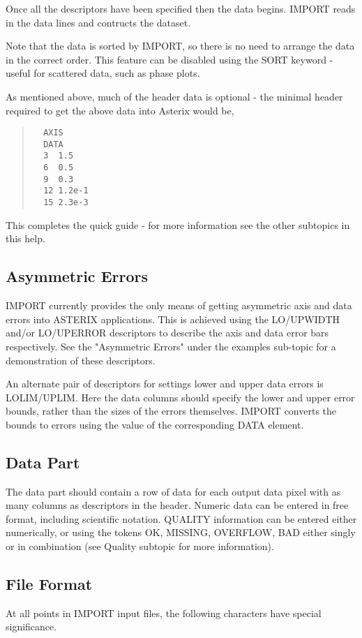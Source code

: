 \documentclass{book}
\renewcommand{\_}{{\tt\char'137}}     %
\begin{document}
Once all the descriptors have been specified then the data
begins. IMPORT reads in the data lines and contructs the dataset.

Note that the data is sorted by IMPORT, so there is no need to
arrange the data in the correct order. This feature can be
disabled using the SORT keyword - useful for scattered data,
such as phase plots.

As mentioned above, much of the header data is optional - the
minimal header required to get the above data into Asterix
would be,

\begin{quote}\begin{verbatim}
  AXIS
  DATA
  3  1.5
  6  0.5
  9  0.3
  12 1.2e-1
  15 2.3e-3
\end{verbatim}\end{quote}
This completes the quick guide - for more information see the
other subtopics in this help.

\subsection{Asymmetric Errors}
IMPORT currently provides the only means of getting asymmetric
axis and data errors into ASTERIX applications. This is achieved
using the LO/UPWIDTH and/or LO/UPERROR descriptors to describe
the axis and data error bars respectively. See the "Asymmetric
Errors" under the examples sub-topic for a demonstration of
these descriptors.

An alternate pair of descriptors for settings lower and upper
data errors is LOLIM/UPLIM. Here the data columns should specify
the lower and upper error bounds, rather than the sizes of the
errors themselves. IMPORT converts the bounds to errors using the
value of the corresponding DATA element.

\subsection{Data Part}
The data part should contain a row of data for each output data
pixel with as many columns as descriptors in the header. Numeric
data can be entered in free format, including scientific notation.
QUALITY information can be entered either numerically, or using
the tokens OK, MISSING, OVERFLOW, BAD either singly or in
combination (see Quality subtopic for more information).

\subsection{File Format}
At all points in IMPORT input files, the following characters
have special significance.
\end{document}
